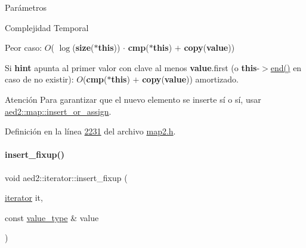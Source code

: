 \begin{DoxyParams}{\-Parámetros}
\begin{DoxyCompactItemize}
\begin{DoxyDescription}
\item[Complejidad Temporal]
\begin{DoxyItemize}
\item Peor caso\+: $O$( $\log$({\bfseries size}({\bfseries $\ast$this})) $\cdot$ {\bfseries cmp}({\bfseries $\ast$this}) $+$ {\bfseries copy}({\bfseries value}))
\item Si {\bfseries hint} apunta al primer valor con clave al menos {\bfseries value}.first (o {\bfseries this}-\/$>$\hyperlink{classaed2_1_1iterator_a67caf9468be999e9be96b7add5d79946_a67caf9468be999e9be96b7add5d79946}{end()} en caso de no existir)\+: $O$({\bfseries cmp}({\bfseries $\ast$this}) $+$ {\bfseries copy}({\bfseries value})) amortizado. 
\end{DoxyItemize}
\end{DoxyDescription}

\begin{DoxyAttention}{Atención}
Para garantizar que el nuevo elemento se inserte sí o sí, usar \hyperlink{classaed2_1_1map_a2ef6723c183916276b0afc4a4c721475_a2ef6723c183916276b0afc4a4c721475}{aed2\+::map\+::insert\+\_\+or\+\_\+assign}. 
\end{DoxyAttention}


Definición en la línea \hyperlink{map2_8h_source_l02231}{2231} del archivo \hyperlink{map2_8h_source}{map2.\+h}.

\mbox{\label{classaed2_1_1iterator_ab23378eb6149357e1a2167e9804eb6e3_ab23378eb6149357e1a2167e9804eb6e3}} 
\paragraph{\texorpdfstring{insert\+\_\+fixup()}{insert\_fixup()}}
{\footnotesize\ttfamily void aed2\+::iterator\+::insert\+\_\+fixup (\begin{DoxyParamCaption}\item[{\hyperlink{classaed2_1_1iterator_1_1iterator}{iterator}}]{it,  }\item[{const \hyperlink{classaed2_1_1iterator_a6411a2c08b2b7c52f063bef1a168acb6_a6411a2c08b2b7c52f063bef1a168acb6}{value\+\_\+type} \&}]{value }\end{DoxyParamCaption})\hspace{0.3cm}{\ttfamily [inline]}}




\end{DoxyCompactItemize}
\end{DoxyParams}
